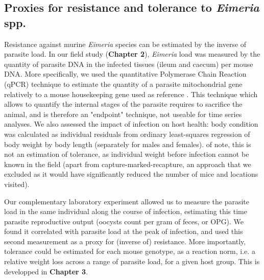 \subsection{Proxies for resistance and tolerance to \textit{Eimeria} spp.}
Resistance against murine \textit{Eimeria} species can be estimated by the inverse of parasite load. In our field study (\textbf{Chapter 2}), \textit{Eimeria} load was measured by the quantity of parasite DNA in the infected tissues (ileum and caecum) per mouse DNA. More specifically, we used the quantitative Polymerase Chain Reaction (qPCR) technique to estimate the quantity of a parasite mitochondrial gene relatively to a mouse housekeeping gene used as reference \citep{al-khlifeh_eimeria_2019, jarquin-diaz_detection_2019}. This technique which allows to quantify the internal stages of the parasite requires to sacrifice the animal, and is therefore an "endpoint" technique, not useable for time series analyses. We also assessed the impact of infection on host health: body condition was calculated as individual residuals from ordinary least-squares regression of body weight by body length (separately for males and females). of note, this is not an estimation of tolerance, as individual weight before infection cannot be known in the field (apart from capture-marked-recapture, an approach that we excluded as it would have significantly reduced the number of mice and locations visited).
\par
Our complementary laboratory experiment allowed us to measure the parasite load in the same individual along the course of infection, estimating this time parasite reproductive output (oocysts count per gram of feces, or OPG). We found it correlated with parasite load at the peak of infection, and used this second measurement as a proxy for (inverse of) resistance. More importantly, tolerance could be estimated for each mouse genotype, as a reaction norm, i.e. a relative weight loss across a range of parasite load, for a given host group. This is developped in \textbf{Chapter 3}.

\newpage

